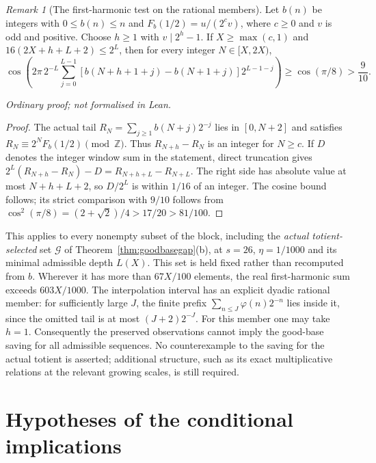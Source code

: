 \documentclass[11pt]{article}
\theoremstyle{plain}
\theoremstyle{definition}
\theoremstyle{remark}
\newtheorem{rem}[thm]{Remark}
\newcommand{\Z}{\mathbb{Z}}
\begin{document}
\begin{rem}[The first-harmonic test on the rational members]
\label{long249:prop:signed-first-harmonic}
Let $b(n)$ be integers with $0\le b(n)\le n$ and
$F_b(1/2)=u/(2^cv)$, where $c\ge0$ and $v$ is odd and positive.
Choose $h\ge1$ with $v\mid2^h-1$. If $X\ge\max(c,1)$ and
$16(2X+h+L+2)\le2^L$, then for every integer $N\in[X,2X)$,
\[
 \cos\left(2\pi\,2^{-L}\sum_{j=0}^{L-1}
    [b(N+h+1+j)-b(N+1+j)]2^{L-1-j}\right)
 \ge\cos(\pi/8)>\frac9{10}.
\]
\end{rem}
\noindent\emph{Ordinary proof; not formalised in Lean.}


\begin{proof}
The actual tail $R_N=\sum_{j\ge1}b(N+j)2^{-j}$ lies in $[0,N+2]$
and satisfies $R_N\equiv2^NF_b(1/2)\pmod\Z$. Thus
$R_{N+h}-R_N$ is an integer for $N\ge c$. If $D$ denotes the integer
window sum in the statement, direct truncation gives
$2^L(R_{N+h}-R_N)-D=R_{N+h+L}-R_{N+L}$.
The right side has absolute value at most $N+h+L+2$, so $D/2^L$ is
within $1/16$ of an integer. The cosine bound follows; its strict
comparison with $9/10$ follows from
$\cos^2(\pi/8)=(2+\sqrt2)/4>17/20>81/100$.
\end{proof}

This applies to every nonempty subset of the block, including the
\emph{actual totient-selected} set $\mathcal G$ of
Theorem~\ref{thm:goodbasegap}(b), at $s=26$, $\eta=1/1000$ and its
minimal admissible depth $L(X)$. This set is held fixed rather
than recomputed from $b$. Wherever it has more than $67X/100$
elements, the real first-harmonic sum exceeds $603X/1000$.
The interpolation interval has an explicit dyadic rational member: for
sufficiently large $J$, the finite prefix
$\sum_{n\le J}\varphi(n)2^{-n}$ lies inside it, since the omitted tail
is at most $(J+2)2^{-J}$. For this member one may take $h=1$.
Consequently the preserved observations cannot imply the good-base
saving for all admissible sequences. No counterexample to the saving
for the actual totient is asserted; additional structure, such as its
exact multiplicative relations at the relevant growing scales, is
still required.

\section{Hypotheses of the conditional implications}
\label{sec:promotion-audit}
\end{document}
